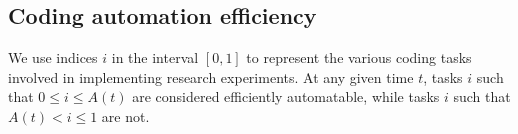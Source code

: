 \documentclass{article}
\theoremstyle{definition}
\begin{document}

\subsection{Coding automation efficiency} \label{Coding automation efficiency}

We use indices $i$ in the interval $[0,1]$ to represent the various coding tasks involved in implementing research experiments. At any given time $t$, tasks $i$ such that $0 \leq i \leq A(t)$ are considered efficiently automatable, while tasks $i$ such that $A(t) < i \leq 1$ are not.
\end{document}
